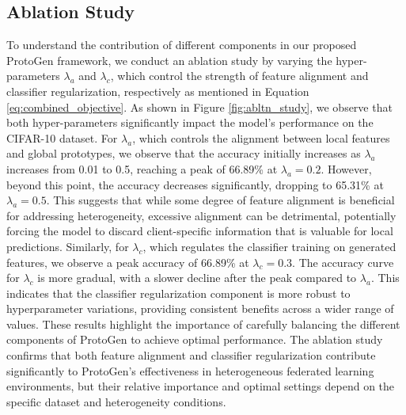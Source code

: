 \documentclass[lettersize,journal]{IEEEtran}
\begin{document}
\subsection{Ablation Study}
To understand the contribution of different components in our proposed \textsf{ProtoGen} framework, we conduct an ablation study by varying the hyper-parameters $\lambda_a$ and $\lambda_c$, which control the strength of feature alignment and classifier regularization, respectively as mentioned in Equation \ref{eq:combined_objective}. As shown in Figure \ref{fig:abltn_study}, we observe that both hyper-parameters significantly impact the model's performance on the CIFAR-10 dataset.
For $\lambda_a$, which controls the alignment between local features and global prototypes, we observe that the accuracy initially increases as $\lambda_a$ increases from 0.01 to 0.5, reaching a peak of 66.89\% at $\lambda_a = 0.2$. However, beyond this point, the accuracy decreases significantly, dropping to 65.31\% at $\lambda_a = 0.5$. This suggests that while some degree of feature alignment is beneficial for addressing heterogeneity, excessive alignment can be detrimental, potentially forcing the model to discard client-specific information that is valuable for local predictions.
Similarly, for $\lambda_c$, which regulates the classifier training on generated features, we observe a peak accuracy of 66.89\% at $\lambda_c = 0.3$. The accuracy curve for $\lambda_c$ is more gradual, with a slower decline after the peak compared to $\lambda_a$. This indicates that the classifier regularization component is more robust to hyperparameter variations, providing consistent benefits across a wider range of values.
These results highlight the importance of carefully balancing the different components of \textsf{ProtoGen} to achieve optimal performance. The ablation study confirms that both feature alignment and classifier regularization contribute significantly to \textsf{ProtoGen}'s effectiveness in heterogeneous federated learning environments, but their relative importance and optimal settings depend on the specific dataset and heterogeneity conditions.
\end{document}
